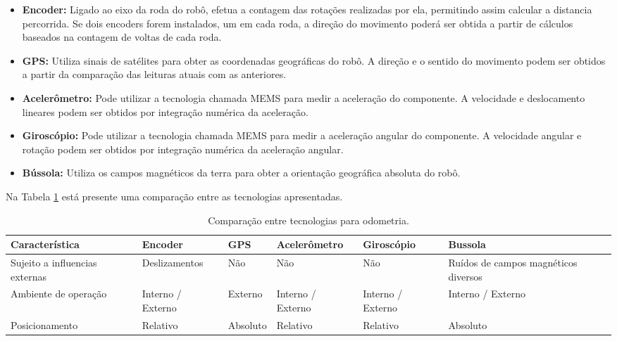 \begin{itemize}
  \item \textbf{Encoder:} Ligado ao eixo da roda do robô, efetua a contagem das rotações realizadas por ela, permitindo assim calcular a distancia percorrida. Se dois encoders forem instalados, um em cada roda, a direção do movimento poderá ser obtida a partir de cálculos baseados na contagem de voltas de cada roda.
  \item \textbf{GPS:} Utiliza sinais de satélites para obter as coordenadas geográficas do robô. A direção e o sentido do movimento podem ser obtidos a partir da comparação das leituras atuais com as anteriores.
  \item 	\textbf{Acelerômetro:} Pode utilizar a tecnologia chamada MEMS para medir a aceleração do componente. A velocidade e deslocamento lineares podem ser obtidos por integração numérica da aceleração.
  \item 	\textbf{Giroscópio:} Pode utilizar a tecnologia chamada MEMS para medir a aceleração angular do componente. A velocidade angular e rotação podem ser obtidos por integração numérica da aceleração angular.
  \item 	\textbf{Bússola:} Utiliza os campos magnéticos da terra para obter a orientação geográfica absoluta do robô.
\end{itemize}

Na Tabela \ref{tab:alternativas_tecnologias_odometria} está presente uma comparação entre as tecnologias apresentadas. 

\begin{table}[h]
  \caption{Comparação entre tecnologias para odometria.}
  \centering
  \begin{tabular}{p{3cm}|p{2.2cm}p{1.7cm}p{2.2cm}p{2.2cm}p{2.2cm}}
    \toprule
    \textbf{Característica} & \textbf{Encoder} & \textbf{GPS} & \textbf{Acelerômetro} & \textbf{Giroscópio} & \textbf{Bussola} \\
    \hline
    Sujeito a influencias externas & Deslizamentos & Não & Não & Não & Ruídos de campos magnéticos diversos \\
    \hline
    Ambiente de operação & Interno / Externo & Externo & Interno / Externo & Interno / Externo & Interno / Externo \\
    \hline
    Posicionamento & Relativo & Absoluto & Relativo & Relativo & Absoluto \\
    \bottomrule
  \end{tabular}
  \label{tab:alternativas_tecnologias_odometria}
\end{table}

